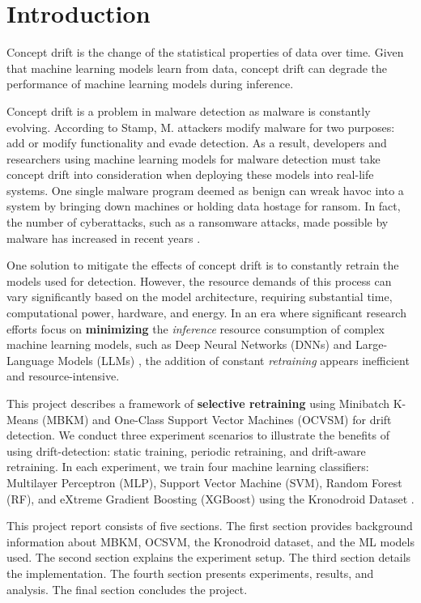\chapter{Introduction}

Concept drift is the change of the statistical properties of data over time.
Given that machine learning models learn from data, concept drift
can degrade the performance of machine learning models during inference.

Concept drift is a problem in malware detection as
malware is constantly evolving. According to Stamp, M. \cite{stamp2023malware}
attackers modify malware for two purposes: add or modify functionality
and evade detection. As a result, developers and researchers using
machine learning models for malware detection must take concept
drift into consideration when deploying these models into real-life systems.
One single malware program deemed as benign can wreak havoc into a system
by bringing down machines or holding data hostage for ransom. In fact,
the number of cyberattacks, such as a ransomware attacks, made possible
by malware has increased in recent years \cite{bertia2022ransomware}.

One solution to mitigate the effects of concept drift is to constantly retrain
the models used for detection. However, the resource demands of this process
can vary significantly based on the model architecture, 
requiring substantial time, computational power, hardware, and energy.
In an era where significant research efforts focus on \textbf{minimizing} the
\textit{inference} resource consumption of complex machine learning models,
such as Deep Neural Networks (DNNs) and Large-Language Models (LLMs) \cite{energyTrendsInAI},
the addition of constant \textit{retraining} appears inefficient and resource-intensive.

This project describes a framework of \textbf{selective retraining} using
Minibatch K-Means (MBKM) and One-Class Support Vector Machines (OCVSM)
for drift detection. We conduct three experiment scenarios
to illustrate the benefits of using drift-detection: static training,
periodic retraining, and drift-aware retraining. In each experiment,
we train four machine learning classifiers: Multilayer Perceptron (MLP),
Support Vector Machine (SVM), Random Forest (RF), and eXtreme Gradient Boosting (XGBoost)
using the Kronodroid Dataset \cite{guerra2021kronodroid}.

This project report consists of five sections. The first section provides background information
about MBKM, OCSVM, the Kronodroid dataset, and the ML models used.
The second section explains the experiment setup. The third section details the implementation.
The fourth section presents experiments, results, and analysis.
The final section concludes the project.
